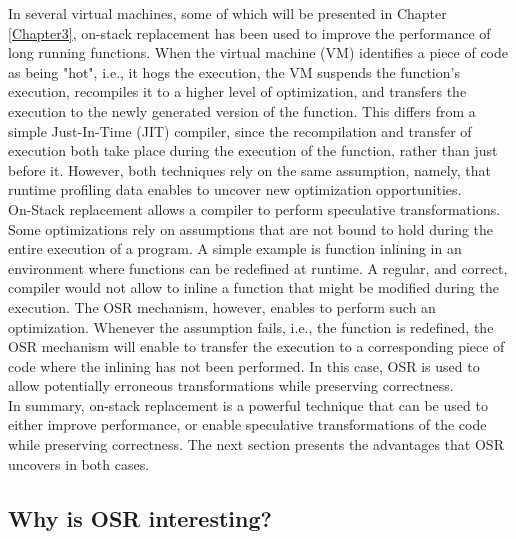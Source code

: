 In several virtual machines\cite{paleczny2001java, lameed2013modular, holzle1992debugging, fink2003design, soman2006efficient, duboscq2014speculation, OSRKit, WebKitFTL}, some of which will be presented in Chapter \ref{Chapter3}, on-stack replacement has been used to improve the performance of long running functions.
When the virtual machine (VM) identifies a piece of code as being "hot", i.e., it hogs the execution, the VM suspends the function's execution, recompiles it to a higher level of optimization, and transfers the execution to the newly generated version of the function.
This differs from a simple Just-In-Time (JIT) compiler, since the recompilation and transfer of execution both take place during the execution of the function, rather than just before it.
However, both techniques rely on the same assumption, namely, that runtime profiling data enables to uncover new optimization opportunities.\\

On-Stack replacement allows a compiler to perform speculative transformations.
Some optimizations rely on assumptions that are not bound to hold during the entire execution of a program.
A simple example is function inlining in an environment where functions can be redefined at runtime.
A regular, and correct, compiler would not allow to inline a function that might be modified during the execution.
The OSR mechanism, however, enables to perform such an optimization.
Whenever the assumption fails, i.e., the function is redefined, the OSR mechanism will enable to transfer the execution to a corresponding piece of code where the inlining has not been performed.
In this case, OSR is used to allow potentially erroneous transformations while preserving correctness.\\

In summary, on-stack replacement is a powerful technique that can be used to either improve performance, or enable speculative transformations of the code while preserving correctness.
The next section presents the advantages that OSR uncovers in both cases.

\subsection{Why is OSR interesting?}\label{WhyOSRInteresting}
    
